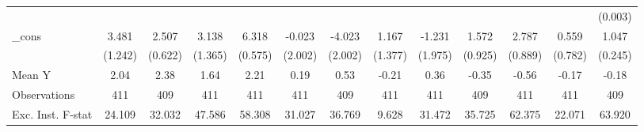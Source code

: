 {\begin{tabular}{l*{12}{c}}
            &                     &                     &                     &                     &                     &                     &                     &                     &                     &                     &                     &     (0.003)         \\
\addlinespace
\_cons      &       3.481\sym{**} &       2.507\sym{***}&       3.138\sym{**} &       6.318\sym{***}&      -0.023         &      -4.023\sym{*}  &       1.167         &      -1.231         &       1.572         &       2.787\sym{***}&       0.559         &       1.047\sym{***}\\
            &     (1.242)         &     (0.622)         &     (1.365)         &     (0.575)         &     (2.002)         &     (2.002)         &     (1.377)         &     (1.975)         &     (0.925)         &     (0.889)         &     (0.782)         &     (0.245)         \\
\midrule
Mean Y      &        2.04         &        2.38         &        1.64         &        2.21         &        0.19         &        0.53         &       -0.21         &        0.36         &       -0.35         &       -0.56         &       -0.17         &       -0.18         \\
Observations&         411         &         409         &         411         &         411         &         411         &         409         &         411         &         411         &         409         &         411         &         411         &         409         \\
Exc. Inst. F-stat&      24.109         &      32.032         &      47.586         &      58.308         &      31.027         &      36.769         &       9.628         &      31.472         &      35.725         &      62.375         &      22.071         &      63.920         \\
\bottomrule
\end{tabular}
}
